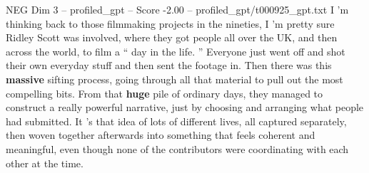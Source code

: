 \begin{textsample}{NEG Dim 3 – profiled\_gpt – Score -2.00 – profiled\_gpt/t000925\_gpt.txt}  \label{ex:f3_neg_023}
I ’m thinking back to those filmmaking projects in the nineties, I ’m pretty sure Ridley Scott was involved, where they got people all over the UK, and then across the world, to film a “ day in the life. ” Everyone just went off and shot their own everyday stuff and then sent the footage in.
Then there was this \textbf{massive} sifting process, going through all that material to pull out the most compelling bits.
From that \textbf{huge} pile of ordinary days, they managed to construct a really powerful narrative, just by choosing and arranging what people had submitted.
It ’s that idea of lots of different lives, all captured separately, then woven together afterwards into something that feels coherent and meaningful, even though none of the contributors were coordinating with each other at the time.

\end{textsample}
